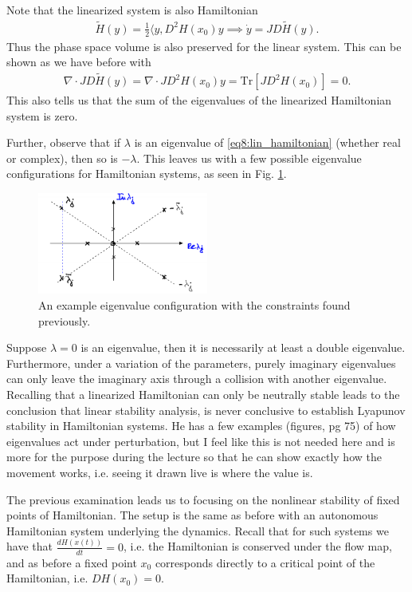Note that the linearized system is also Hamiltonian
\begin{align}
	\tilde{H}(y) = \frac{1}{2} \langle y, D^{2}H(x_0)y \implies \dot{y} = JD\tilde{H}(y).
\end{align}
Thus the phase space volume is also preserved for the linear system. This can be shown as we have before with
\begin{align}
	\nabla \cdot JD\tilde{H}(y) =  \nabla \cdot JD^2H(x_0) y =  \textrm{Tr} [JD^2H(x_0)] = 0.
\end{align}
This also tells us that the sum of the eigenvalues of the linearized Hamiltonian system is zero.

Further, observe that if $\lambda $ is an eigenvalue of \eqref{eq8:lin_hamiltonian} (whether real or complex), then so is $- \lambda $. This leaves us with a few possible eigenvalue configurations for Hamiltonian systems, as seen in Fig. \ref{fig:new_eigv_configs}.
\begin{figure}[h!]
	\centering
	\includegraphics[width=0.5\textwidth]{figures/ch8/16new_eigv_config.png}
	\caption{An example eigenvalue configuration with the constraints found previously.}
	\label{fig:new_eigv_configs}
\end{figure}

Suppose $\lambda=0$ is an eigenvalue, then it is necessarily at least a double eigenvalue. Furthermore, under a variation of the parameters, purely imaginary eigenvalues can only leave the imaginary axis through a collision with another eigenvalue. 
Recalling that a linearized Hamiltonian can only be neutrally stable leads to the conclusion that linear stability analysis, is never conclusive to establish Lyapunov stability  in Hamiltonian systems. 
{\color{blue} He has a few examples (figures, pg 75) of how eigenvalues act under perturbation, but I feel like this is not needed here and is more for the purpose during the lecture so that he can show exactly how the movement works, i.e. seeing it drawn live is where the value is.}

The previous examination leads us to focusing on the nonlinear stability of fixed points of Hamiltonian. The setup is the same as before with an autonomous Hamiltonian system underlying the dynamics. Recall that for such systems we have that $\frac{dH(x(t))}{dt}=0$, i.e. the Hamiltonian is conserved under the flow map, and as before a fixed point $x_0$ corresponds directly to a critical point of the Hamiltonian, i.e. $DH(x_0)=0$.

